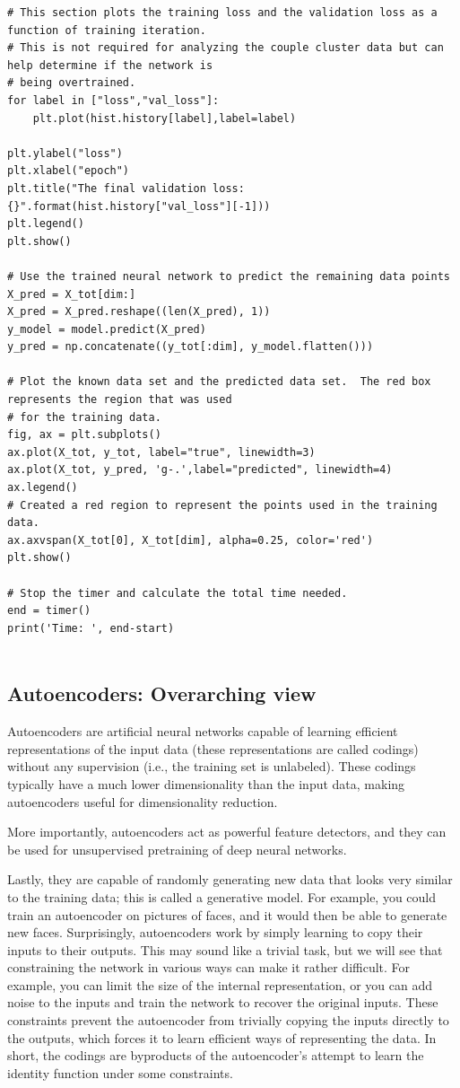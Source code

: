 \documentclass[%
oneside,                 %
final,                   %
10pt]{article}
\begin{document}
\begin{verbatim}
# This section plots the training loss and the validation loss as a function of training iteration.
# This is not required for analyzing the couple cluster data but can help determine if the network is
# being overtrained.
for label in ["loss","val_loss"]:
    plt.plot(hist.history[label],label=label)

plt.ylabel("loss")
plt.xlabel("epoch")
plt.title("The final validation loss: {}".format(hist.history["val_loss"][-1]))
plt.legend()
plt.show()

# Use the trained neural network to predict the remaining data points
X_pred = X_tot[dim:]
X_pred = X_pred.reshape((len(X_pred), 1))
y_model = model.predict(X_pred)
y_pred = np.concatenate((y_tot[:dim], y_model.flatten()))

# Plot the known data set and the predicted data set.  The red box represents the region that was used
# for the training data.
fig, ax = plt.subplots()
ax.plot(X_tot, y_tot, label="true", linewidth=3)
ax.plot(X_tot, y_pred, 'g-.',label="predicted", linewidth=4)
ax.legend()
# Created a red region to represent the points used in the training data.
ax.axvspan(X_tot[0], X_tot[dim], alpha=0.25, color='red')
plt.show()

# Stop the timer and calculate the total time needed.
end = timer()
print('Time: ', end-start)


\end{verbatim}


\subsection*{Autoencoders: Overarching view}

Autoencoders are artificial neural networks capable of learning
efficient representations of the input data (these representations are called codings)  without
any supervision (i.e., the training set is unlabeled). These codings
typically have a much lower dimensionality than the input data, making
autoencoders useful for dimensionality reduction. 

More importantly, autoencoders act as powerful feature detectors, and
they can be used for unsupervised pretraining of deep neural networks.

Lastly, they are capable of randomly generating new data that looks
very similar to the training data; this is called a generative
model. For example, you could train an autoencoder on pictures of
faces, and it would then be able to generate new faces.  Surprisingly,
autoencoders work by simply learning to copy their inputs to their
outputs. This may sound like a trivial task, but we will see that
constraining the network in various ways can make it rather
difficult. For example, you can limit the size of the internal
representation, or you can add noise to the inputs and train the
network to recover the original inputs. These constraints prevent the
autoencoder from trivially copying the inputs directly to the outputs,
which forces it to learn efficient ways of representing the data. In
short, the codings are byproducts of the autoencoder’s attempt to
learn the identity function under some constraints.
\end{document}
